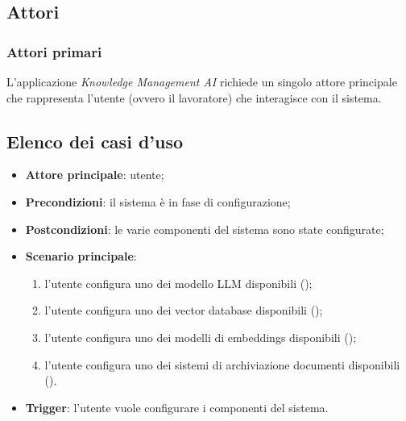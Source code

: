 \documentclass[10pt, a4paper]{article}
\begin{document}
\subsection{Attori}
\subsubsection{Attori primari}
L'applicazione \textit{Knowledge Management AI} richiede un singolo attore principale che rappresenta l'utente (ovvero il lavoratore) che interagisce con il sistema.
\newpage
\subsection{Elenco dei casi d'uso}

    \begin{itemize}
        \item \textbf{Attore principale}: utente;
        \item \textbf{Precondizioni}: il sistema è in fase di configurazione;
        \item \textbf{Postcondizioni}: le varie componenti del sistema sono state configurate;
        \item \textbf{Scenario principale}:
            \begin{enumerate}
                \item l'utente configura uno dei modello LLM disponibili ();
                \item l'utente configura uno dei vector database disponibili ();
                \item l'utente configura uno dei modelli di embeddings disponibili ();
                \item l'utente configura uno dei sistemi di archiviazione documenti disponibili ().
            \end{enumerate}
        \item \textbf{Trigger}: l’utente vuole configurare i componenti del sistema.
    \end{itemize}

    
\end{document}
